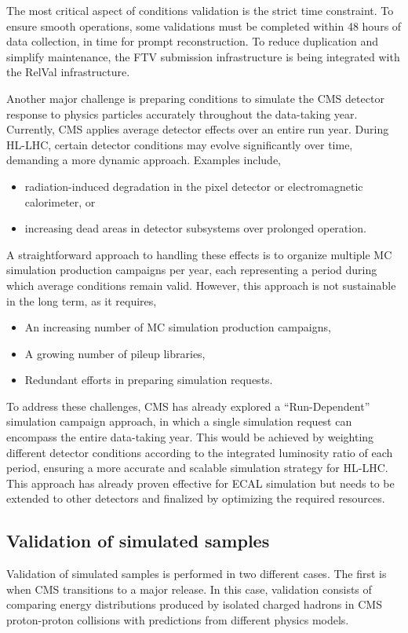 The most critical aspect of conditions validation is the strict time constraint. To ensure smooth operations, some validations must be completed within 48 hours of data collection, in time for prompt reconstruction. To reduce duplication and simplify maintenance, the FTV submission infrastructure is being integrated with the \gls{RelVal} infrastructure.

Another major challenge is preparing conditions to simulate the CMS detector response to physics particles accurately throughout the data-taking year. Currently, CMS applies average detector effects over an entire run year. During \gls{HL-LHC}, certain detector conditions may evolve significantly over time, demanding a more dynamic approach. Examples include, 
\begin{itemize}
    \item radiation-induced degradation in the pixel detector or electromagnetic calorimeter, or
    \item increasing dead areas in detector subsystems over prolonged operation. 
\end{itemize}
A straightforward approach to handling these effects is to organize multiple \gls{MC} simulation production campaigns per year, each representing a period during which average conditions remain valid. However, this approach is not sustainable in the long term, as it requires,
\begin{itemize}
    \item An increasing number of \gls{MC} simulation production campaigns,
    \item A growing number of pileup libraries,
    \item Redundant efforts in preparing simulation requests.
\end{itemize}
To address these challenges, CMS has already explored a ``Run-Dependent'' simulation campaign approach, in which a single simulation request can encompass the entire data-taking year. This would be achieved by weighting different detector conditions according to the integrated luminosity ratio of each period, ensuring a more accurate and scalable simulation strategy for \gls{HL-LHC}. This approach has already proven effective for \gls{ECAL} simulation but needs to be extended to other detectors and finalized by optimizing the required resources.

\subsection {Validation of simulated samples}
Validation of simulated samples is performed in two different cases. The first is when CMS transitions to a major \GEANTfour release. In this case, validation consists of comparing energy distributions produced by isolated charged hadrons in CMS proton-proton collisions with predictions from different \GEANTfour physics models. 

